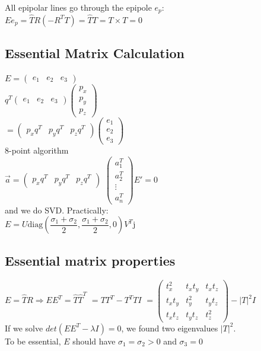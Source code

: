 All epipolar lines go through the epipole $e_p$:\\
$E e_p = \hat{T} R (-R^T T) = \hat{T}T = T \times T = 0$

\subsection*{Essential Matrix Calculation}
$E = \begin{pmatrix}e_1 & e_2 & e_3 \end{pmatrix}$\\
$q^T \begin{pmatrix}e_1 & e_2 & e_3 \end{pmatrix}
\begin{pmatrix}p_x \\ p_y \\ p_z \end{pmatrix}$ \\
$= \begin{pmatrix}p_x q^T & p_y q^T&p_z q^T \end{pmatrix}
\begin{pmatrix}e_1 \\ e_2 \\ e_3 \end{pmatrix}$\\
8-point algorithm\\
$\vec{a} = \begin{pmatrix}p_x q^T & p_y q^T&p_z q^T \end{pmatrix}$
$\begin{pmatrix} a_1^T \\ a_2^T \\ \vdots \\ a_n^T \end{pmatrix} E' =
0$\\
and we do SVD. Practically: \\
$E = U \text{diag}\left(\dfrac{\sigma_1 + \sigma_2}{2}, \dfrac{\sigma_1
+ \sigma_2}{2}, 0 \right) V^T$j

\subsection*{Essential matrix properties}
$E = \hat{T} R \Rightarrow E E^T = \hat{T} \hat{T}^T$ 
$=T T^T - T^T T I$
$=\begin{pmatrix} 
  t_x^2 & t_x t_y & t_x t_z \\
  t_x t_y & t_y^2 & t_y t_z \\
  t_x t_z & t_y t_z & t_z^2
\end{pmatrix} - |T|^2 I$\\
If we solve $det(E E^T - \lambda I) = 0$, we found two eigenvalues
$|T|^2$.\\
To be essential, $E$ should have $\sigma_1 = \sigma_2 > 0$ and $\sigma_3
= 0$

